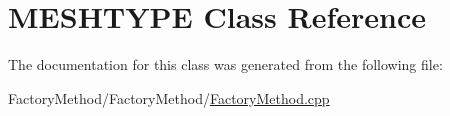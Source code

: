 \hypertarget{class_m_e_s_h_t_y_p_e}{}\section{M\+E\+S\+H\+T\+Y\+PE Class Reference}
\label{class_m_e_s_h_t_y_p_e}


The documentation for this class was generated from the following file\+:\begin{DoxyCompactItemize}
\item 
Factory\+Method/\+Factory\+Method/\mbox{\hyperlink{_factory_method_8cpp}{Factory\+Method.\+cpp}}\end{DoxyCompactItemize}
